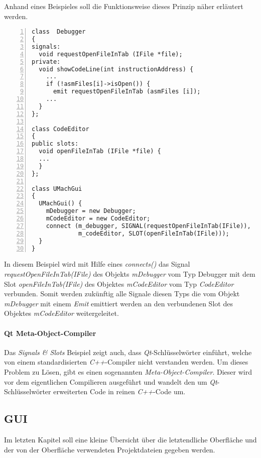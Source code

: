 Anhand eines Beispieles soll die Funktionsweise dieses Prinzip näher erläutert werden.

\begin{lstlisting}[numbers=left, numberstyle=\tiny]
class  Debugger
{
signals:
  void requestOpenFileInTab (IFile *file);
private:
  void showCodeLine(int instructionAddress) {
    ...
    if (!asmFiles[i]->isOpen()) {
      emit requestOpenFileInTab (asmFiles [i]);
    ...
  }
};

class CodeEditor
{
public slots:
  void openFileInTab (IFile *file) {
  ...
  }
};	

class UMachGui
{
  UMachGui() {  	
    mDebugger = new Debugger;
    mCodeEditor = new CodeEditor;
    connect (m_debugger, SIGNAL(requestOpenFileInTab(IFile)),
             m_codeEditor, SLOT(openFileInTab(IFile)));  
  }
}
\end{lstlisting}

In diesem Beispiel wird mit Hilfe eines \emph{connects()} das Signal \emph{requestOpenFileInTab(IFile)} des Objekts \emph{mDebugger} vom Typ Debugger mit dem Slot \emph{openFileInTab(IFile)} des Objektes \emph{mCodeEditor} vom Typ \emph{CodeEditor} verbunden. Somit werden zukünftig alle Signale diesen Typs die vom Objekt \emph{mDebugger} mit einem \emph{Emit} emittiert werden an den verbundenen Slot des Objektes \emph{mCodeEditor} weitergeleitet.

\paragraph{Qt Meta-Object-Compiler}
Das \emph{Signals \& Slots }Beispiel zeigt auch, dass \emph{Qt}-Schlüsselwörter einführt, welche von einem standardisierten \emph{C++}-Compiler nicht verstanden werden. Um dieses Problem zu Lösen, gibt es einen sogenannten \emph{Meta-Object-Compiler}. Dieser wird vor dem eigentlichen Compilieren ausgeführt und wandelt den um \emph{Qt}-Schlüsselwörter erweiterten Code in reinen \emph{C++}-Code um.

\subsection{GUI}

Im letzten Kapitel soll eine kleine Übersicht über die letztendliche Oberfläche und der von der Oberfläche verwendeten Projektdateien gegeben werden.

